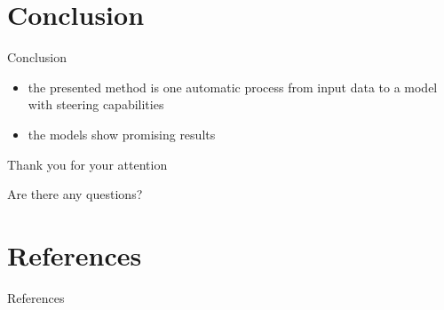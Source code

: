 \documentclass[]{beamer}
\begin{document}
\section{Conclusion}
\begin{frame}{Conclusion}
  \begin{itemize}
    \item the presented method is one automatic process from input data to a model with steering capabilities
    \item the models show promising results
  \end{itemize}
\end{frame}


\begin{frame}[c]
  \centering \Large
  Thank you for your attention

  \vspace{0.5em} \large
  Are there any questions?
\end{frame}


\section*{References}
\begin{frame}[allowframebreaks]{References}
  \printbibliography
\end{frame}
\end{document}
